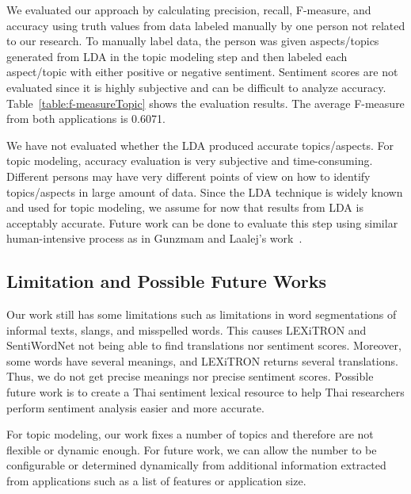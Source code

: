 
We evaluated our approach by calculating precision, recall, F-measure, and accuracy using truth values from data labeled manually by one person not related to our research. To manually label data, the person was given aspects/topics generated from LDA in the topic modeling step and then labeled each aspect/topic with either positive or negative sentiment. Sentiment scores are not evaluated since it is highly subjective and can be difficult to analyze accuracy. Table~\ref{table:f-measureTopic} shows the evaluation results. The average F-measure from both applications is 0.6071. 

We have not evaluated whether the LDA produced accurate topics/aspects. For topic modeling, accuracy evaluation is very subjective and time-consuming. Different persons may have very different points of view on how to identify topics/aspects in large amount of data.  Since the LDA technique is widely known and used for topic modeling, we assume for now that results from LDA is acceptably accurate. Future work can be done to evaluate this step using similar human-intensive process as in Gunzmam and Laalej's work~\cite{userslikefeature}.

\subsection*{Limitation and Possible Future Works}
Our work still has some limitations such as limitations in word segmentations of informal texts, slangs, and misspelled words. This causes LEXiTRON and SentiWordNet not being able to find translations nor sentiment scores. Moreover, some words have several meanings, and LEXiTRON returns several translations. Thus, we do not get precise meanings nor precise sentiment scores. Possible future work is to create a Thai sentiment lexical resource to help Thai researchers perform sentiment analysis easier and more accurate.

For topic modeling, our work fixes a number of topics and therefore are not flexible or dynamic enough. For future work, we can allow the number to be configurable or determined dynamically from additional information extracted from applications such as a list of features or application size.


